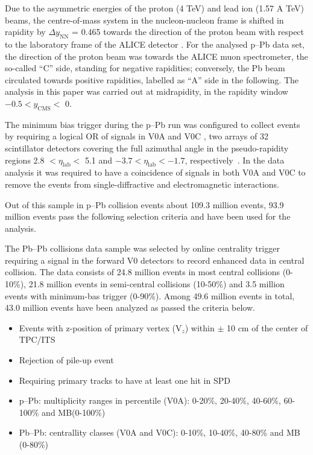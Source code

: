 Due to the asymmetric energies of the proton (4 TeV) and lead ion (1.57 A TeV) beams, the centre-of-mass system in the nucleon-nucleon frame is shifted in rapidity by $\Delta y_{\mathrm{NN}}$ = 0.465 towards the 
direction of the proton beam with respect to the laboratory frame of the ALICE detector \cite{cite:KphipPb}. 
For the analysed p--Pb data set, the direction of the proton beam was towards the ALICE muon spectrometer, the so-called ``C'' side, standing for negative rapidities; conversely, the Pb beam circulated towards positive rapidities, labelled as ``A'' side in the following. The analysis in this paper was carried out at midrapidity, 
in the rapidity window $-0.5 < y_{\mathrm{CMS}} <$ 0.

The minimum bias trigger during the p--Pb run was configured to collect events by requiring a logical OR of signals in V0A and V0C \cite{cite:ALICEPerformance}, two arrays of 32 scintillator detectors covering the full azimuthal angle in the pseudo-rapidity regions 2.8 $< \eta_{\mathrm{lab}} <$ 5.1 and $-3.7 < \eta_{\mathrm{lab}} < -1.7$, respectively~\cite{cite:rapidity}. In the data analysis it was required to have a coincidence of signals in both V0A and V0C to remove the events from single-diffractive and electromagnetic interactions. 

Out of this sample in p--Pb collision events about 109.3 million events, 93.9 million events pass the following selection criteria and have been used for the analysis.  %

The Pb--Pb collisions data sample was selected by online centrality trigger requiring a signal in the forward V0 detectors\cite{cite:centralityPbPb}  to record enhanced data in central collision. The data consists of 24.8 million events in most central collisions (0-10\%), 21.8 million events in semi-central collisions (10-50\%) and 3.5 million events with minimum-bas trigger (0-90\%). Among 49.6 million events in total, 43.0 million events have been analyzed as passed the criteria below. 



\begin{itemize}
\item Events with z-position of primary vertex (V$_{z}$) within $\pm$ 10 cm of the center of TPC/ITS
\item Rejection of pile-up event 
\item Requiring primary tracks to have at least one hit in SPD
\item p--Pb: multiplicity ranges in percentile (V0A): 0-20\%, 20-40\%, 40-60\%, 60-100\% and MB(0-100\%) 
\item Pb--Pb: centrallity classes (V0A and V0C): 0-10\%, 10-40\%, 40-80\% and MB (0-80\%)  
\end{itemize}


